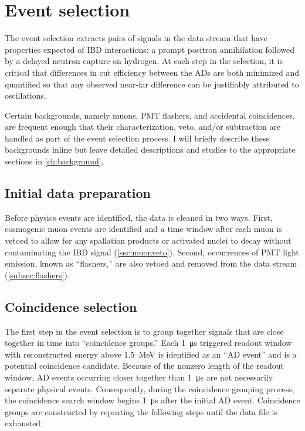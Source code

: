 \chapter{Event selection}
The event selection extracts pairs of signals
in the data stream that have properties expected of
IBD interactions: a prompt positron annihilation
followed by a delayed neutron capture on hydrogen.
At each step in the selection, it is critical that
differences in cut efficiency between the ADs are both
minimized and quantified so that any observed near-far difference
can be justifiably attributed to oscillations.

Certain backgrounds, namely muons, PMT flashers, and accidental coincidences,
are frequent enough that their characterization, veto, and/or subtraction
are handled as part of the event selection process.
I will briefly describe these backgrounds inline
but leave detailed descriptions and studies
to the appropriate sections in \cref{ch:background}.

\section{Initial data preparation}

Before physics events are identified,
the data is cleaned in two ways.
First, cosmogenic muon events are identified
and a time window after each muon is vetoed
to allow for any spallation products or activated nuclei to decay
without contaminating the IBD signal (\cref{sec:muonveto}).
Second, occurrences of PMT light emission, known as ``flashers,''
are also vetoed and removed from the data stream (\cref{subsec:flashers}).

\section{Coincidence selection}
\label{sec:coincidence}

The first step in the event selection is
to group together signals that are close together in time
into ``coincidence groups.''
Each \SI{1}{\micro\second} triggered readout window
with reconstructed energy above \SI{1.5}{\mega\electronvolt}
is identified as an ``AD event''
and is a potential coincidence candidate.
Because of the nonzero length of the readout window,
AD events occurring closer together than \SI{1}{\micro\second}
are not necessarily separate physical events.
Consequently, during the coincidence grouping process,
the coincidence search window begins \SI{1}{\micro\second}
after the initial AD event.
Coincidence groups are constructed by repeating the following steps
until the data file is exhausted:

